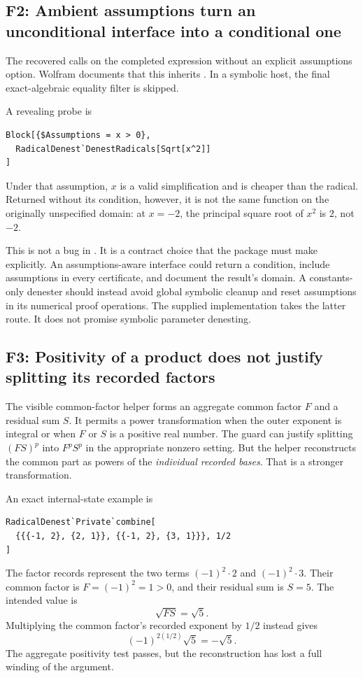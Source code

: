 \documentclass[11pt,letterpaper]{article}
\numberwithin{equation}{section}
\theoremstyle{definition}\newtheorem{definition}[theorem]{Definition}
\theoremstyle{remark}\newtheorem{remark}[theorem]{Remark}
\newcommand{\code}[1]{\texttt{\detokenize{#1}}}
\newcommand{\finding}[2]{\subsection{#1: #2}}
\begin{document}
\finding{F2}{Ambient assumptions turn an unconditional interface into a conditional one}
The recovered \code{safeSimplify} calls \code{Simplify} on the completed expression without an explicit assumptions option. Wolfram documents that this inherits \code{$Assumptions} \cite{wl-simplify}. In a symbolic host, the final exact-algebraic equality filter is skipped.

A revealing probe is
\begin{lstlisting}
Block[{$Assumptions = x > 0},
  RadicalDenest`DenestRadicals[Sqrt[x^2]]
]
\end{lstlisting}
Under that assumption, $x$ is a valid simplification and is cheaper than the radical. Returned without its condition, however, it is not the same function on the originally unspecified domain: at $x=-2$, the principal square root of $x^2$ is $2$, not $-2$.

This is not a bug in \code{Simplify}. It is a contract choice that the package must make explicitly. An assumptions-aware interface could return a condition, include assumptions in every certificate, and document the result's domain. A constants-only denester should instead avoid global symbolic cleanup and reset assumptions in its numerical proof operations. The supplied implementation takes the latter route. It does not promise symbolic parameter denesting.

\finding{F3}{Positivity of a product does not justify splitting its recorded factors}
The visible common-factor helper forms an aggregate common factor $F$ and a residual sum $S$. It permits a power transformation when the outer exponent is integral or when $F$ or $S$ is a positive real number. The guard can justify splitting $(FS)^p$ into $F^p S^p$ in the appropriate nonzero setting. But the helper reconstructs the common part as powers of the \emph{individual recorded bases}. That is a stronger transformation.

An exact internal-state example is
\begin{lstlisting}
RadicalDenest`Private`combine[
  {{{-1, 2}, {2, 1}}, {{-1, 2}, {3, 1}}}, 1/2
]
\end{lstlisting}
The factor records represent the two terms $(-1)^2\cdot2$ and $(-1)^2\cdot3$. Their common factor is $F=(-1)^2=1>0$, and their residual sum is $S=5$. The intended value is
\[
 \sqrt{FS}=\sqrt5.
\]
Multiplying the common factor's recorded exponent by $1/2$ instead gives
\[
 (-1)^{2(1/2)}\sqrt5=-\sqrt5.
\]
The aggregate positivity test passes, but the reconstruction has lost a full winding of the argument.
\end{document}
